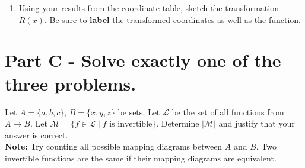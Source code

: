 \documentclass[12pt]{article} %
\begin{document}
\begin{qstn}
\begin{enumerate}[label=(\alph*)]
\begin{center}
        \end{center}

  \newpage

   \item Using your results from the coordinate table, sketch the transformation $R(x)$. Be sure to
     \textbf{label} the transformed coordinates as well as the function.

    \begin{center}
    \end{center}
  \end{enumerate}
\end{qstn}

\newpage


\section*{Part C - Solve exactly one of the three problems.} 

\begin{qstn}
  Let $A = \{a,b,c\}$, $B = \{x,y,z\}$ be sets. Let $\mathcal{L}$ be the set of all functions from $A \to B$. Let
  $\mathcal{M} = \{f \in \mathcal{L} \mid f \text{ is invertible}\} $. Determine $\left|\mathcal{M}\right|$ and
  justify that your answer is correct.\\
  \textbf{Note: }Try counting all possible mapping diagrams between $A$ and $B$. Two invertible functions are the same if their mapping diagrams are equivalent.
\end{qstn}
\end{document}
